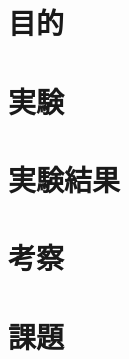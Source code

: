\documentclass[uplatex, 11pt,a4j, titlepage]{jsarticle}
\begin{document}

\subtitle{2019/*/*}

\section{目的}
\section{実験}
\section{実験結果}
\section{考察}
\section{課題}


\newpage
\thispagestyle{empty}
\nocite{Material}


\end{document}
